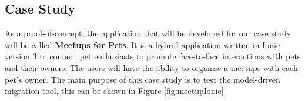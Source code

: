 \documentclass[conference]{IEEEtran}
\begin{document}
\subsection{Case Study}
As a proof-of-concept, the application that will be developed for our case study will be called \textbf{Meetups for Pets}. It is a hybrid application written
in Ionic version 3 to connect pet enthusiasts to promote face-to-face interactions with pets and their owners. The users will have the ability to organise a
meetups with each pet’s owner. The main purpose of this case study is to test the model-driven migration tool, this can be shown in Figure \ref{fig:meetupIonic}
\begin{figure}[!htb]%
    \centering

\end{figure}
\end{document}
